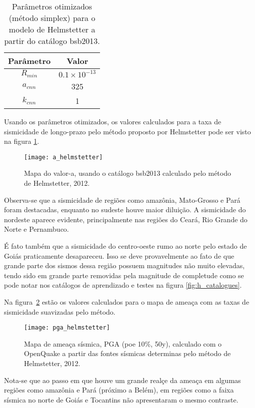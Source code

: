 \begin{table}[H]
	\centering
	\begin{tabular}{c|c}
		Parâmetro & Valor \\ \hline
		$R_{min}$ & $0.1\times10^{-13}$ \\
		$a_{cnn}$ & 325 \\
		$k_{cnn}$ & 1 \\
	\end{tabular}
	\caption{Parâmetros otimizados (método simplex) para o modelo de Helmstetter a partir do catálogo \gls{bsb2013}.}
	\label{tab:hemlstetter}
\end{table}

Usando os parâmetros otimizados, os valores calculados para a taxa de sismicidade
de longo-prazo pelo método proposto por Helmstetter pode ser visto na figura \ref{fig:helm_r}.

\begin{figure}[H]
  \centering
  \texttt{[image: a\_helmstetter]} 
  \caption{Mapa do valor-a, usando o catálogo \gls{bsb2013} calculado pelo método de Helmstetter, 2012.}
  \label{fig:helm_r} 
\end{figure}

Observa-se que a sismicidade de regiões como amazônia, Mato-Grosso e Pará foram destacadas,
enquanto no sudeste houve maior diluição. A sismicidade do nordeste aparece evidente, principalmente
nas regiões do Ceará, Rio Grande do Norte e Pernambuco. 

É fato também que a sismicidade do centro-oeste rumo ao norte pelo estado de Goiás praticamente desapareceu.
Isso se deve provavelmente ao fato de que grande parte dos sismos dessa região possuem magnitudes não 
muito elevadas, tendo sido em grande parte removidas pela magnitude de completude como se pode notar nos catálogos
de aprendizado e testes na figura \ref{fig:h_catalogues}.

Na figura~\ref{fig:helm_h} estão os valores calculados para o mapa de ameaça 
com as taxas de sismicidade suavizadas pelo método.

\begin{figure}[H]
  \centering
  \texttt{[image: pga\_helmstetter]} 
  \caption{Mapa de ameaça sísmica, PGA (poe 10\%, 50y), 
  		   calculado com o OpenQuake a partir das fontes sísmicas
  		   determinas pelo método de Helmstetter, 2012.}
  \label{fig:helm_h} 
\end{figure}

Nota-se que ao passo em que houve um grande realçe da ameaça em algumas regiões como amazônia e Pará (próximo a Belém),
em regiões como a faixa sísmica no norte de Goiás e Tocantins não apresentaram o mesmo contraste.


